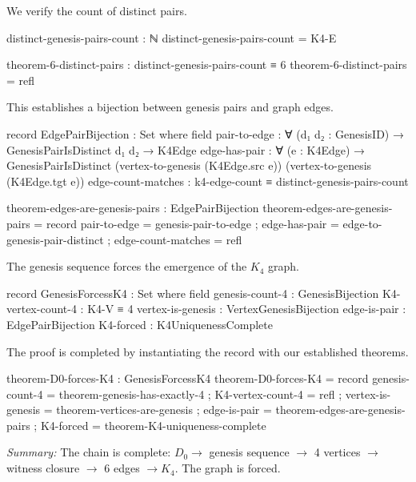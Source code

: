\documentclass[11pt,a4paper]{book}
\begin{document}
We verify the count of distinct pairs.

\begin{code}
distinct-genesis-pairs-count : ℕ
distinct-genesis-pairs-count = K4-E

theorem-6-distinct-pairs : distinct-genesis-pairs-count ≡ 6
theorem-6-distinct-pairs = refl

\end{code}

This establishes a bijection between genesis pairs and graph edges.

\begin{code}
record EdgePairBijection : Set where
  field
    pair-to-edge : ∀ (d₁ d₂ : GenesisID) → GenesisPairIsDistinct d₁ d₂ → K4Edge
    edge-has-pair : ∀ (e : K4Edge) → 
      GenesisPairIsDistinct (vertex-to-genesis (K4Edge.src e)) (vertex-to-genesis (K4Edge.tgt e))
    edge-count-matches : k4-edge-count ≡ distinct-genesis-pairs-count

theorem-edges-are-genesis-pairs : EdgePairBijection
theorem-edges-are-genesis-pairs = record
  { pair-to-edge = genesis-pair-to-edge
  ; edge-has-pair = edge-to-genesis-pair-distinct
  ; edge-count-matches = refl
  }

\end{code}

The genesis sequence forces the emergence of the $K_4$ graph.

\begin{code}
record GenesisForcessK4 : Set where
  field
    genesis-count-4 : GenesisBijection
    K4-vertex-count-4 : K4-V ≡ 4
    vertex-is-genesis : VertexGenesisBijection
    edge-is-pair : EdgePairBijection
    K4-forced : K4UniquenessComplete

\end{code}

The proof is completed by instantiating the record with our established theorems.

\begin{code}
theorem-D0-forces-K4 : GenesisForcessK4
theorem-D0-forces-K4 = record
  { genesis-count-4 = theorem-genesis-has-exactly-4
  ; K4-vertex-count-4 = refl
  ; vertex-is-genesis = theorem-vertices-are-genesis
  ; edge-is-pair = theorem-edges-are-genesis-pairs
  ; K4-forced = theorem-K4-uniqueness-complete
  }
\end{code}

\medskip
\noindent\textit{Summary:} The chain is complete: $D_0 \to$ genesis sequence $\to$ 4 vertices 
$\to$ witness closure $\to$ 6 edges $\to K_4$. The graph is forced.
\end{document}
